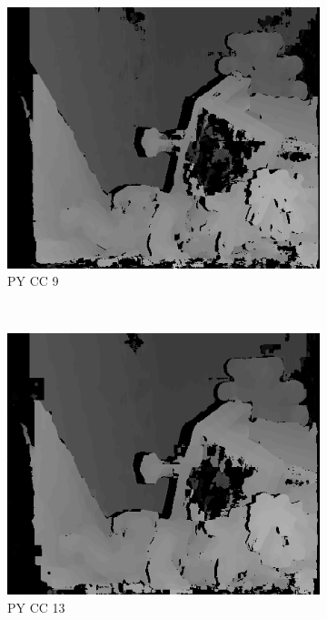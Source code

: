 \begin{figure}
  \begin{subfigure}[b]{0.23\textwidth}
    \centering
    \includegraphics[width=\textwidth]{images/stereo-pairs/teddy_pyramid_crosschecked_9.png}
    \caption{PY CC 9}
  \end{subfigure}
  ~
  \begin{subfigure}[b]{0.23\textwidth}
    \centering
    \includegraphics[width=\textwidth]{images/stereo-pairs/teddy_pyramid_crosschecked_13.png}
    \caption{PY CC 13}
  \end{subfigure}
  ~
  \begin{subfigure}[b]{0.23\textwidth}

\end{subfigure}
\end{figure}
